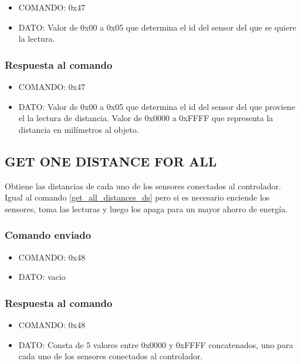 \documentclass[a4paper,10pt]{article}
\begin{document}
\begin{itemize}
	\item{COMANDO:} 0x47
	\item{DATO:} Valor de 0x00 a 0x05 que determina el id del sensor del que se quiere la lectura.
\end{itemize}

\subsubsection*{Respuesta al comando}

\begin{itemize}
	\item{COMANDO:} 0x47
	\item{DATO:} Valor de 0x00 a 0x05 que determina el id del sensor del que proviene el la lectura de distancia.
	Valor de 0x0000 a 0xFFFF que representa la distancia en mil\'imetros al objeto.
\end{itemize}

\subsection{GET ONE DISTANCE FOR ALL}
\label{get_one_distance_for_all_ds}

Obtiene las distancias de cada uno de los sensores conectados al controlador.
Igual al comando \ref{get_all_distances_ds} pero si es necesario enciende los sensores, toma las lecturas y luego los apaga para un mayor ahorro de energ\'ia.

\subsubsection*{Comando enviado}

\begin{itemize}
	\item{COMANDO:} 0x48
	\item{DATO:} vacio
\end{itemize}

\subsubsection*{Respuesta al comando}

\begin{itemize}
	\item{COMANDO:} 0x48
	\item{DATO:} Consta de 5 valores entre 0x0000 y 0xFFFF concatenados, uno para cada uno de los sensores conectados al controlador.
\end{itemize}
\end{document}
